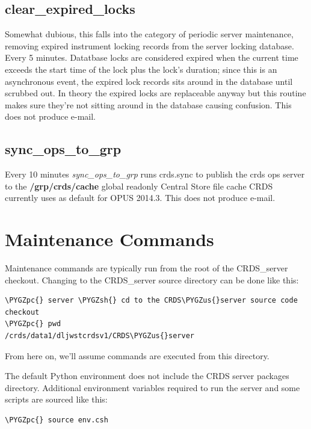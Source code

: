 \documentclass[letterpaper,10pt,english]{sphinxmanual}
\def\PYGZus{\char`\_}
\def\PYGZsh{\char`\#}
\def\PYGZpc{\char`\%}
\begin{document}
\section{clear\_expired\_locks}
\label{server_guide:clear-expired-locks}
Somewhat dubious,  this falls into the category of periodic server maintenance,  removing expired instrument locking
records from the server locking database.   Every 5 minutes.  Datatbase locks are considered expired when the current
time exceeds the start time of the lock plus the lock's duration;  since this is an asynchronous event,  the expired
lock records sits around in the database until scrubbed out.   In theory the expired locks are replaceable anyway
but this  routine makes sure they're not sitting around in the database causing confusion.  This does not produce e-mail.


\section{sync\_ops\_to\_grp}
\label{server_guide:sync-ops-to-grp}
Every 10 minutes \emph{sync\_ops\_to\_grp} runs crds.sync to publish the crds ops server to the \textbf{/grp/crds/cache} global readonly
Central Store file cache CRDS currently uses as default for OPUS 2014.3.   This does not produce e-mail.


\chapter{Maintenance Commands}
\label{server_guide:maintenance-commands}
Maintenance commands are typically run from the root of the CRDS\_server checkout.   Changing to the CRDS\_server source
directory can be done like this:

\begin{Verbatim}[commandchars=\\\{\}]
\PYGZpc{} server \PYGZsh{} cd to the CRDS\PYGZus{}server source code checkout
\PYGZpc{} pwd
/crds/data1/dljwstcrdsv1/CRDS\PYGZus{}server
\end{Verbatim}

From here on,  we'll assume commands are executed from this directory.

The default Python environment does not include the CRDS server packages directory.   Additional environment variables
required to run the server and some scripts are sourced like this:

\begin{Verbatim}[commandchars=\\\{\}]
\PYGZpc{} source env.csh
\end{Verbatim}
\end{document}
